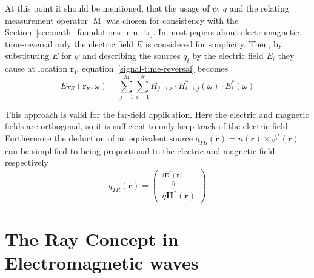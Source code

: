 At this point it should be mentioned, that the usage of \(\psi \), \(q\) and the relating measurement operator \(\operatorname{M}\) was chosen for consistency with the Section~\ref{sec:math_foundations_em_tr}.
In most papers about electromagnetic time-reversal only the electric field \(E\) is considered for simplicity.
Then, by substituting \(E\) for \(\psi \) and describing the sources \(q_i\) by the electric field \(E_i\) they cause at location \(\mathbf{r_i}\), equation~\eqref{signal-time-reversal} becomes
\begin{equation}
    E_{TR}(\mathbf{r_x}, \omega) = \sum_{j=1}^{M} \sum_{i=1}^{N} H_{j\rightarrow x} \cdot H^*_{i\rightarrow j}(\omega) \cdot E^*_i(\omega)
\end{equation}

This approach is valid for the far-field application.
Here the electric and magnetic fields are orthogonal, so it is sufficient to only keep track of the electric field.
Furthermore the deduction of an equivalent source \(q_{TR}(\mathbf{r}) = n(\mathbf{r}) \times \psi^*(\mathbf{r})\) can be simplified to being proportional to the electric and magnetic field respectively~\parencite{de_rosny_theory_2010}
\begin{equation}
    q_{T R}(\mathbf{r})=\left(\begin{array}{c}
        \frac{i \mathbf{E}^*(\mathbf{r})}{\eta} \\
        \eta \mathbf{H}^*(\mathbf{r})
        \end{array}\right)
\end{equation}





\section{The Ray Concept in Electromagnetic waves}



